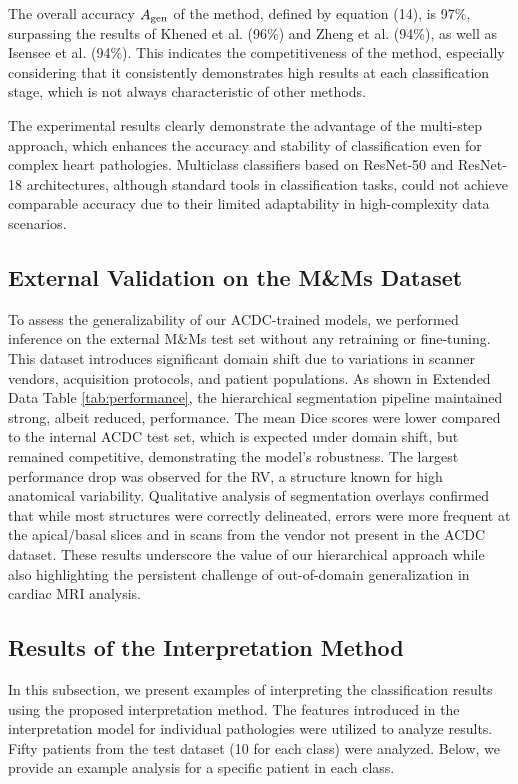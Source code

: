 \documentclass[fleqn,10pt]{wlscirep}
\begin{document}
The overall accuracy \({A_{{\rm{gen}}}}\) of the method, defined by equation (14), is 97\%, surpassing the results of Khened et al. (96\%) and Zheng et al. (94\%), as well as Isensee et al. (94\%). This indicates the competitiveness of the method, especially considering that it consistently demonstrates high results at each classification stage, which is not always characteristic of other methods.

The experimental results clearly demonstrate the advantage of the multi-step approach, which enhances the accuracy and stability of classification even for complex heart pathologies. Multiclass classifiers based on ResNet-50 and ResNet-18 architectures, although standard tools in classification tasks, could not achieve comparable accuracy due to their limited adaptability in high-complexity data scenarios.

\subsection*{External Validation on the M\&Ms Dataset}
To assess the generalizability of our ACDC-trained models, we performed inference on the external M\&Ms test set without any retraining or fine-tuning. This dataset introduces significant domain shift due to variations in scanner vendors, acquisition protocols, and patient populations. As shown in Extended Data Table \ref{tab:performance}, the hierarchical segmentation pipeline maintained strong, albeit reduced, performance. The mean Dice scores were lower compared to the internal ACDC test set, which is expected under domain shift, but remained competitive, demonstrating the model's robustness. The largest performance drop was observed for the RV, a structure known for high anatomical variability. Qualitative analysis of segmentation overlays confirmed that while most structures were correctly delineated, errors were more frequent at the apical/basal slices and in scans from the vendor not present in the ACDC dataset. These results underscore the value of our hierarchical approach while also highlighting the persistent challenge of out-of-domain generalization in cardiac MRI analysis.

\subsection*{Results of the Interpretation Method}

In this subsection, we present examples of interpreting the classification results using the proposed interpretation method. The features introduced in the interpretation model for individual pathologies were utilized to analyze results. Fifty patients from the test dataset (10 for each class) were analyzed. Below, we provide an example analysis for a specific patient in each class.
\end{document}
